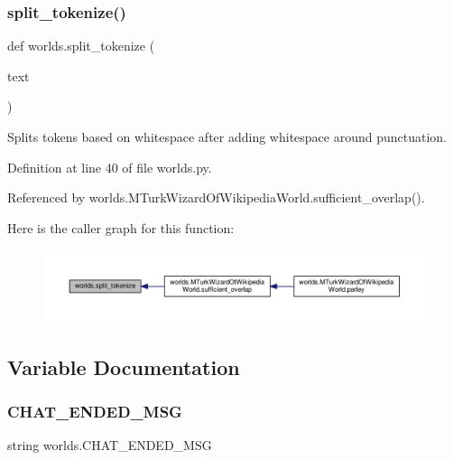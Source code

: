 \subsubsection{\texorpdfstring{split\+\_\+tokenize()}{split\_tokenize()}}
{\footnotesize\ttfamily def worlds.\+split\+\_\+tokenize (\begin{DoxyParamCaption}\item[{}]{text }\end{DoxyParamCaption})}

\begin{DoxyVerb}Splits tokens based on whitespace after adding whitespace around
punctuation.
\end{DoxyVerb}
 

Definition at line 40 of file worlds.\+py.



Referenced by worlds.\+M\+Turk\+Wizard\+Of\+Wikipedia\+World.\+sufficient\+\_\+overlap().

Here is the caller graph for this function\+:
\nopagebreak
\begin{figure}[H]
\begin{center}
\leavevmode
\includegraphics[width=350pt]{namespaceworlds_a177b303e39cf751847e7f357c5bcc1ff_icgraph}
\end{center}
\end{figure}


\subsection{Variable Documentation}
\mbox{\label{namespaceworlds_adfa70af8db946dbd989fe49581f74f19}} 
\subsubsection{\texorpdfstring{C\+H\+A\+T\+\_\+\+E\+N\+D\+E\+D\+\_\+\+M\+SG}{CHAT\_ENDED\_MSG}}
{\footnotesize\ttfamily string worlds.\+C\+H\+A\+T\+\_\+\+E\+N\+D\+E\+D\+\_\+\+M\+SG}

